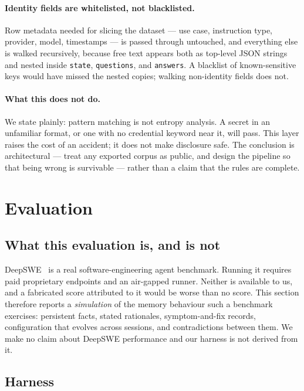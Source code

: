 \documentclass[10pt,twocolumn]{article}
\begin{document}
\paragraph{Identity fields are whitelisted, not blacklisted.}
Row metadata needed for slicing the dataset --- use case, instruction type,
provider, model, timestamps --- is passed through untouched, and everything else
is walked recursively, because free text appears both as top-level JSON strings
and nested inside \texttt{state}, \texttt{questions}, and \texttt{answers}. A
blacklist of known-sensitive keys would have missed the nested copies; walking
non-identity fields does not.

\paragraph{What this does not do.}
We state plainly: pattern matching is not entropy analysis. A secret in an
unfamiliar format, or one with no credential keyword near it, will pass. This
layer raises the cost of an accident; it does not make disclosure safe. The
conclusion is architectural --- treat any exported corpus as public, and design
the pipeline so that being wrong is survivable --- rather than a claim that the
rules are complete.

\section{Evaluation}
\label{sec:eval}

\subsection{What this evaluation is, and is not}

DeepSWE~\citep{deepswe} is a real software-engineering agent benchmark.
Running it requires paid proprietary endpoints and an air-gapped runner. Neither is available to us, and a fabricated score attributed to it
would be worse than no score. This section therefore reports a
\emph{simulation} of the memory behaviour such a benchmark exercises:
persistent facts, stated rationales, symptom-and-fix records, configuration
that evolves across sessions, and contradictions between them. We make no claim
about DeepSWE performance and our harness is not derived from it.

\subsection{Harness}
\end{document}
